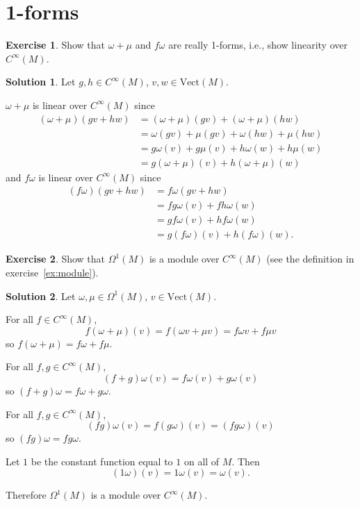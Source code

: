 \documentclass[11pt, a4paper]{report}
\theoremstyle{definition}
\newtheorem{ex}{Exercise}[part]
\newtheorem{sol}{Solution}[part]
\begin{document}
\section{1-forms}

\begin{ex}

Show that $\omega + \mu$ and $f\omega$ are really 1-forms, i.e., show linearity over $C^\infty(M)$.

\end{ex}

\begin{sol}

Let $g, h \in C^\infty(M)$, $v, w \in \text{Vect}(M)$.

$\omega + \mu$ is linear over $C^\infty(M)$ since
\begin{align*}
    (\omega + \mu)(gv + hw) &= (\omega + \mu)(gv) + (\omega + \mu)(hw) \\
        &= \omega(gv) + \mu(gv) + \omega(hw) + \mu(hw) \\
        &= g\omega(v) + g\mu(v) + h\omega(w) + h\mu(w) \\
        &= g(\omega + \mu)(v)  + h(\omega + \mu)(w)
\end{align*}
and $f\omega$ is linear over $C^\infty(M)$ since
\begin{align*}
    (f\omega)(gv + hw) &= f\omega(gv + hw) \\
                       &= fg\omega(v) + fh\omega(w) \\
                       &= gf\omega(v) + hf\omega(w) \\
                       &= g(f\omega)(v) + h(f\omega)(w).
\end{align*}

\end{sol}

\begin{ex}

Show that $\Omega^1(M)$ is a module over $C^\infty(M)$ (see the definition in exercise~\ref{ex:module}).

\end{ex}

\begin{sol}

Let $\omega, \mu \in \Omega^1(M)$, $v\in \text{Vect}(M)$.

For all $f \in C^\infty(M)$,
\[
    f(\omega + \mu)(v) = f(\omega v + \mu v) = f\omega v + f\mu v
\]
so $f(\omega + \mu) = f\omega + f\mu$.

For all $f, g \in C^\infty(M)$,
\[
    (f + g)\omega(v) = f\omega(v) + g\omega(v)
\]
so $(f + g)\omega = f\omega + g\omega$.

For all $f, g \in C^\infty(M)$,
\[
    (fg)\omega(v) = f(g\omega)(v) = (fg\omega)(v)
\]
so $(fg)\omega = fg\omega$.

Let $1$ be the constant function equal to $1$ on all of $M$. Then
\[
    (1\omega)(v) = 1\omega(v) = \omega(v).
\]

Therefore $\Omega^1(M)$ is a module over $C^\infty(M)$.

\end{sol}
\end{document}
